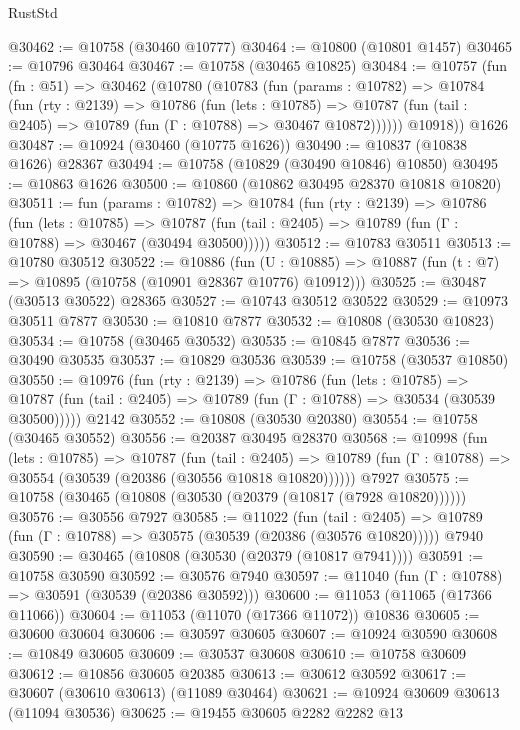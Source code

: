 \begin{lexlean}{RustStd}
\begin{coremodule}
@30462 := @10758 (@30460 @10777)
@30464 := @10800 (@10801 @1457)
@30465 := @10796 @30464
@30467 := @10758 (@30465 @10825)
@30484 := @10757
    (fun (fn : @51) =>
    @30462
      (@10780
        (@10783
          (fun (params : @10782) =>
          @10784
            (fun (rty : @2139) =>
            @10786
              (fun (lets : @10785) =>
              @10787 (fun (tail : @2405) => @10789 (fun (Γ : @10788) => @30467 @10872))))))
        @10918))
    @1626
@30487 := @10924 (@30460 (@10775 @1626))
@30490 := @10837 (@10838 @1626) @28367
@30494 := @10758 (@10829 (@30490 @10846) @10850)
@30495 := @10863 @1626
@30500 := @10860 (@10862 @30495 @28370 @10818 @10820)
@30511 := fun (params : @10782) =>
  @10784
    (fun (rty : @2139) =>
    @10786
      (fun (lets : @10785) =>
      @10787 (fun (tail : @2405) => @10789 (fun (Γ : @10788) => @30467 (@30494 @30500)))))
@30512 := @10783 @30511
@30513 := @10780 @30512
@30522 := @10886
    (fun (U : @10885) => @10887 (fun (t : @7) => @10895 (@10758 (@10901 @28367 @10776) @10912)))
@30525 := @30487 (@30513 @30522) @28365
@30527 := @10743 @30512 @30522
@30529 := @10973 @30511 @7877
@30530 := @10810 @7877
@30532 := @10808 (@30530 @10823)
@30534 := @10758 (@30465 @30532)
@30535 := @10845 @7877
@30536 := @30490 @30535
@30537 := @10829 @30536
@30539 := @10758 (@30537 @10850)
@30550 := @10976
    (fun (rty : @2139) =>
    @10786
      (fun (lets : @10785) =>
      @10787 (fun (tail : @2405) => @10789 (fun (Γ : @10788) => @30534 (@30539 @30500)))))
    @2142
@30552 := @10808 (@30530 @20380)
@30554 := @10758 (@30465 @30552)
@30556 := @20387 @30495 @28370
@30568 := @10998
    (fun (lets : @10785) =>
    @10787
      (fun (tail : @2405) =>
      @10789 (fun (Γ : @10788) => @30554 (@30539 (@20386 (@30556 @10818 @10820))))))
    @7927
@30575 := @10758 (@30465 (@10808 (@30530 (@20379 (@10817 (@7928 @10820))))))
@30576 := @30556 @7927
@30585 := @11022
    (fun (tail : @2405) => @10789 (fun (Γ : @10788) => @30575 (@30539 (@20386 (@30576 @10820)))))
    @7940
@30590 := @30465 (@10808 (@30530 (@20379 (@10817 @7941))))
@30591 := @10758 @30590
@30592 := @30576 @7940
@30597 := @11040 (fun (Γ : @10788) => @30591 (@30539 (@20386 @30592)))
@30600 := @11053 (@11065 (@17366 @11066))
@30604 := @11053 (@11070 (@17366 @11072)) @10836
@30605 := @30600 @30604
@30606 := @30597 @30605
@30607 := @10924 @30590
@30608 := @10849 @30605
@30609 := @30537 @30608
@30610 := @10758 @30609
@30612 := @10856 @30605 @20385
@30613 := @30612 @30592
@30617 := @30607 (@30610 @30613) (@11089 @30464)
@30621 := @10924 @30609 @30613 (@11094 @30536)
@30625 := @19455 @30605 @2282 @2282 @13

\end{coremodule}
\end{lexlean}
